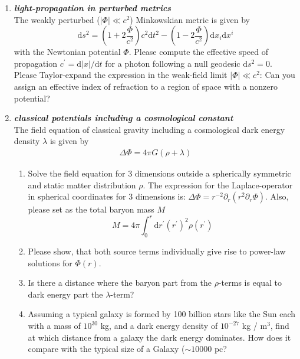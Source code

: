 \documentclass[a4paper,12pt]{article}
\newcommand{\question}[1]{\textbf{\textit{#1}}}
\newcommand{\dd}{\mathrm{d}}
\begin{document}
\begin{enumerate}
\item \question{light-propagation in perturbed metrics}\\
The weakly perturbed ($\left|\Phi\right|\ll c^2$) Minkowskian metric is given by 
\begin{equation}
\dd s^2 = \left(1+2\frac{\Phi}{c^2}\right) c^2\dd t^2 - \left(1-2\frac{\Phi}{c^2}\right)\dd x_i\dd x^i
\end{equation}
with the Newtonian potential $\Phi$. Please compute the effective speed of propagation $c^\prime = \dd\left|x\right|/\dd t$ for a photon following a null geodesic $\dd s^2=0$. Please Taylor-expand the expression in the weak-field limit $\left|\Phi\right|\ll c^2$: Can you assign an effective index of refraction to a region of space with a nonzero potential?


\item \question{classical potentials including a cosmological constant}\\
The field equation of classical gravity including a cosmological dark
energy density $\lambda$ is given by
\begin{align}
\Delta\Phi = 4\pi G(\rho + \lambda)
\end{align}
\begin{enumerate}
\item{Solve the field equation for $3$ dimensions outside a
    spherically symmetric and static matter distribution $\rho$. The
    expression for the Laplace-operator in spherical coordinates for
    $3$ dimensions is: $\Delta\Phi=
    r^{-2}\partial_r(r^2\partial_r\Phi)$. Also, please set as the
    total baryon mass $M$
\begin{equation}
M = 4\pi\int_0^r\dd r^\prime (r^\prime)^2\rho(r^\prime)
\end{equation}
}
\item{Please show, that both source terms individually give rise to power-law solutions for $\Phi(r)$.}
\item{Is there a distance where the baryon part from the $\rho$-terms
    is equal to dark energy part the $\lambda$-term?}
\item{Assuming a typical galaxy is formed by 100 billion stars like
    the Sun each with a mass of $10^{30}$ kg, and a dark energy density
    of $10^{-27}$ kg / m$^3$, find at which distance from a galaxy the
    dark energy dominates. How does it compare with the typical size
    of a Galaxy ($\sim 10000$ pc?}
\end{enumerate}



\end{enumerate}
\end{document}

